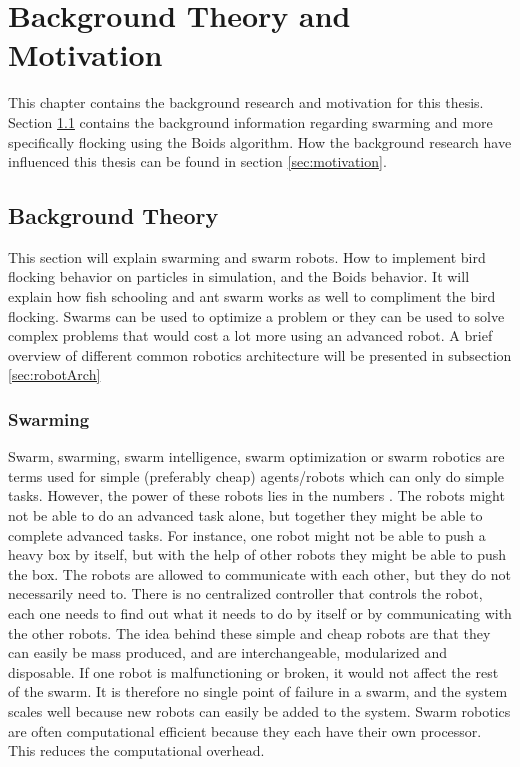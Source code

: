 \chapter{Background Theory and Motivation}
\label{cha:TheoryAndBackground}
This chapter contains the background research and motivation for this thesis.
Section \ref{sec:background} contains the background information regarding swarming and more specifically flocking using the Boids algorithm. How the background research have influenced this thesis can be found in section \ref{sec:motivation}.

\section{Background Theory}
\label{sec:background}
This section will explain swarming and swarm robots. How to implement bird flocking behavior on particles in simulation, and the Boids behavior. It will explain how fish schooling and ant swarm works as well to compliment the bird flocking. Swarms can be used to optimize a problem or they can be used to solve complex problems that would cost a lot more using an advanced robot.
A brief overview of different common robotics architecture will be presented in subsection \ref{sec:robotArch}

\subsection{Swarming}
Swarm, swarming, swarm intelligence, swarm optimization or swarm robotics are terms used for simple (preferably cheap) agents/robots which can only do simple tasks. However, the power of these robots lies in the numbers \citep{Zhu2010,Bonabeau1999}. The robots might not be able to do an advanced task alone, but together they might be able to complete advanced tasks. For instance, one robot might not be able to push a heavy box by itself, but with the help of other robots they might be able to push the box.
The robots are allowed to communicate with each other, but they do not necessarily need to. There is no centralized controller that controls the robot, each one needs to find out what it needs to do by itself or by communicating with the other robots. The idea behind these simple and cheap robots are that they can easily be mass produced, and are interchangeable, modularized and disposable. If one robot is malfunctioning or broken, it would not affect the rest of the swarm. It is therefore no single point of failure in a swarm, and the system scales well because new robots can easily be added to the system.
Swarm robotics are often computational efficient because they each have their own processor. This reduces the computational overhead. 

